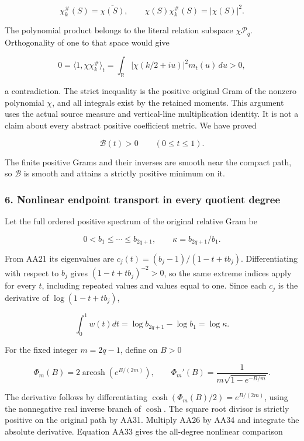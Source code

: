 \[
\chi_k^{\#}(S)=\overline{\chi(S)},\qquad
\chi(S)\chi_k^{\#}(S)=|\chi(S)|^2.
\tag{AA29}
\]

The polynomial product belongs to the literal relation subspace \(\chi\mathcal P_q\). Orthogonality of one to that space would give

\[
0=\langle1,\chi\chi_k^{\#}\rangle_t
=\int_{\mathbb R}|\chi(k/2+iu)|^2m_t(u)\,du>0,
\tag{AA30}
\]

a contradiction. The strict inequality is the positive original Gram of the nonzero polynomial \(\chi\), and all integrals exist by the retained moments. This argument uses the actual source measure and vertical-line multiplication identity. It is not a claim about every abstract positive coefficient metric. We have proved

\[
\mathcal B(t)>0\qquad(0\le t\le1).
\tag{AA31}
\]

The finite positive Grams and their inverses are smooth near the compact path, so \(\mathcal B\) is smooth and attains a strictly positive minimum on it.

\subsubsection{6. Nonlinear endpoint transport in every quotient degree}\label{endpoint-all_degree_angle_review--nonlinear-endpoint-transport-in-every-quotient-degree}

Let the full ordered positive spectrum of the original relative Gram be

\[
0<b_1\le\cdots\le b_{2q+1},\qquad
\kappa=b_{2q+1}/b_1.
\tag{AA32}
\]

From AA21 its eigenvalues are \(c_j(t)=(b_j-1)/(1-t+tb_j)\). Differentiating with respect to \(b_j\) gives \((1-t+tb_j)^{-2}>0\), so the same extreme indices apply for every \(t\), including repeated values and values equal to one. Since each \(c_j\) is the derivative of \(\log(1-t+tb_j)\),

\[
\int_0^1 w(t)dt=\log b_{2q+1}-\log b_1=\log\kappa.
\tag{AA33}
\]

For the fixed integer \(m=2q-1\), define on \(B>0\)

\[
\Phi_m(B)=2\operatorname{arcosh}(e^{B/(2m)}),\qquad
\Phi_m'(B)=\frac1{m\sqrt{1-e^{-B/m}}}.
\tag{AA34}
\]

The derivative follows by differentiating \(\cosh(\Phi_m(B)/2)=e^{B/(2m)}\), using the nonnegative real inverse branch of \(\cosh\). The square root divisor is strictly positive on the original path by AA31. Multiply AA26 by AA34 and integrate the absolute derivative. Equation AA33 gives the all-degree nonlinear comparison

